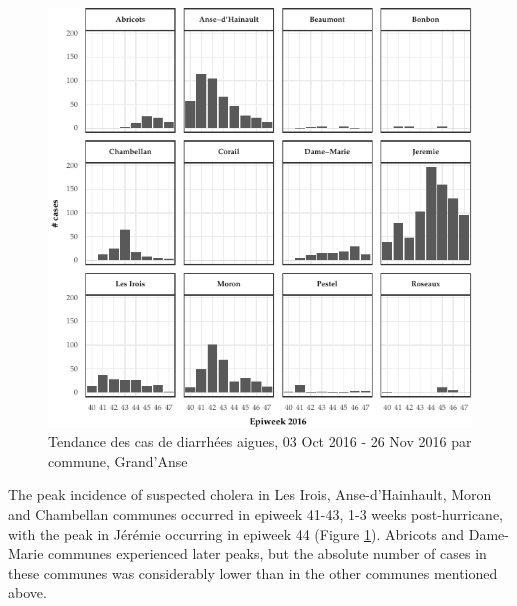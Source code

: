 \documentclass[]{tufte-handout}
\begin{document}
\begin{figure}
\includegraphics{rapport_final_files/figure-latex/epicurve_commune-1} \caption[Tendance des cas de diarrhées aigues, 03 Oct 2016 - 26 Nov 2016 par commune, Grand’Anse]{Tendance des cas de diarrhées aigues, 03 Oct 2016 - 26 Nov 2016 par commune, Grand’Anse}\label{fig:epicurve_commune}
\end{figure}

The peak incidence of suspected cholera in Les Irois, Anse-d'Hainhault,
Moron and Chambellan communes occurred in epiweek 41-43, 1-3 weeks
post-hurricane, with the peak in Jérémie occurring in epiweek 44 (Figure
\ref{fig:epicurve_commune}). Abricots and Dame-Marie communes
experienced later peaks, but the absolute number of cases in these
communes was considerably lower than in the other communes mentioned
above.

\clearpage
\end{document}
